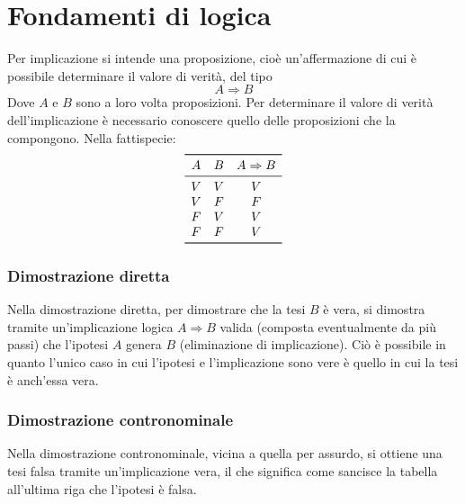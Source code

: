 %
%
%
%


\section{Fondamenti di logica}
Per implicazione si intende una proposizione, cioè un'affermazione di cui è possibile determinare il valore di verità, del tipo
\[
	A\Rightarrow B
\]
Dove $A$ e $B$ sono a loro volta proposizioni.
Per determinare il valore di verità dell'implicazione è necessario conoscere quello delle proposizioni che la compongono. Nella fattispecie:
\[
	\begin{array}{ccc}
		\toprule
		A & B & A\Rightarrow B \\
		\midrule
		V & V & V              \\
		V & F & F              \\
		F & V & V              \\
		F & F & V              \\
		\bottomrule
	\end{array}
\]
\subsubsection{Dimostrazione diretta}
Nella dimostrazione diretta, per dimostrare che la tesi $B$ è vera, si dimostra tramite un'implicazione logica $A\Rightarrow B$ valida (composta eventualmente da più passi) che l'ipotesi $A$ genera $B$ (eliminazione di implicazione). Ciò è possibile in quanto l'unico caso in cui l'ipotesi e l'implicazione sono vere è quello in cui la tesi è anch'essa vera.

\subsubsection{Dimostrazione contronominale}
Nella dimostrazione contronominale, vicina a quella per assurdo, si ottiene una tesi falsa tramite un'implicazione vera, il che significa come sancisce la tabella all'ultima riga che l'ipotesi è falsa.


